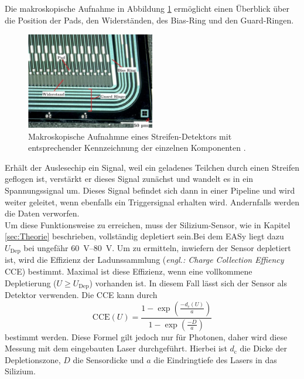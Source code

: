 Die makroskopische Aufnahme in Abbildung \ref{fig:streifendetektor} ermöglicht einen Überblick über die Position der Pads, den Widerständen, des Bias-Ring und den Guard-Ringen.
\begin{figure}[htb]
  \centering
  \includegraphics[width=0.5\textwidth]{graphics/Sensor.png}
  \caption{Makroskopische Aufnahmne eines Streifen-Detektors mit entsprechender Kennzeichnung der einzelnen Komponenten \cite{anleitung}.}
  \label{fig:streifendetektor}
\end{figure}
Erhält der Auslesechip ein Signal, weil ein geladenes Teilchen durch einen Streifen geflogen ist, verstärkt er dieses Signal zunächst und wandelt es in ein Spannungssignal um. Dieses Signal befindet sich dann in einer Pipeline und wird weiter geleitet, wenn ebenfalls ein Triggersignal erhalten wird. Andernfalls werden die Daten verworfen.\\
Um diese Funktionsweise zu erreichen, muss der Silizium-Sensor, wie in Kapitel \ref{sec:Theorie} beschrieben, vollständig depletiert sein.Bei dem EASy liegt dazu $U_\text{Dep}$ bei ungefähr \SIrange{60}{80}{\volt}. Um zu ermitteln, inwiefern der Sensor depletiert ist, wird die Effizienz der Ladunssammlung (\textit{engl.: Charge Collection Effiency} CCE) bestimmt. Maximal ist diese Effizienz, wenn eine vollkommene Depletierung ($U \ge U_\text{Dep}$) vorhanden ist. In diesem Fall lässt sich der Sensor als Detektor verwenden. Die CCE kann durch
\begin{equation}
  \text{CCE}(U) = \frac{1 - \exp\left(\frac{-d_\text{c}(U)}{a}\right)}{1 - \exp\left(\frac{-D}{a}\right)}
  \label{eqn:CCEL}
\end{equation}
bestimmt werden. Diese Formel gilt jedoch nur für Photonen, daher wird diese Messung mit dem eingebauten Laser durchgeführt. Hierbei ist $d_\text{c}$ die Dicke der Depletionszone, $D$ die Sensordicke und $a$ die Eindringtiefe des Lasers in das Silizium.

\FloatBarrier

